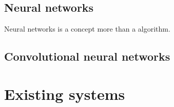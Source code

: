 \documentclass[12pt]{report}
\begin{document}
\subsection{Neural networks}

Neural networks is a concept more than a algorithm.

\subsection{Convolutional neural networks}

\section{Existing systems}
\end{document}
